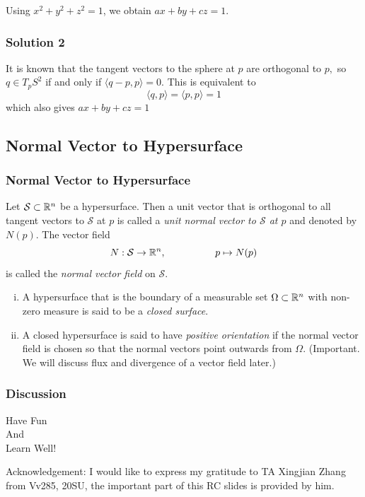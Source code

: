 \documentclass[12pt, t]{beamer}
\renewcommand{\emph}[1]{{\color{Turquoise3}\textsl{#1}}}
\begin{document}
\begin{frame}[allowframebreaks]
    Using $x^2 + y^2 + z^2 = 1$, we obtain $ax + by + cz = 1$.
\end{frame}

\begin{frame}
    \frametitle{Solution 2}
    It is known that the tangent vectors to the sphere at $p$ are orthogonal to $p,$ so $q \in T_{p} S^{2}$ if and only if $\langle q-p, p\rangle=0 .$ This is equivalent to
    \[
        \langle q, p\rangle=\langle p, p\rangle=1
    \]
    which also gives $a x+b y+c z=1$


\end{frame}

\subsection{Normal Vector to Hypersurface}
\begin{frame}
    \frametitle{Normal Vector to Hypersurface}
    Let $\mathcal{S}\subset\mathbb{R}^n$ be a hypersurface. Then a unit vector that is orthogonal to all tangent vectors to $\mathcal{S}$ at $p$ is called a \emph{unit normal vector to $\mathcal{S}$ at $p$} and denoted by $N(p)$. The vector field
    \[N:\mathcal{S}\to\mathbb{R}^n,\qquad\qquad\quad
        p\mapsto N(p)\]
    is called the \emph{normal vector field} on $\mathcal{S}$.

    \begin{enumerate}[(i)]
        \item A hypersurface that is the boundary of a measurable set $\Omega\subset\mathbb{R}^n$ with non-zero measure is said to be a \emph{closed surface}.
        \item A closed hypersurface is said to have \emph{positive orientation} if the
              normal vector field is chosen so that the normal vectors point
              outwards from $\Omega$. (Important. We will discuss flux and divergence of a vector field later.)
    \end{enumerate}
\end{frame}


\begin{frame}
    \frametitle{Discussion}
    \vspace{1cm}
    \begin{center}
        \LARGE
        Have Fun\\
        And\\
        Learn Well!
    \end{center}
    \vspace{2cm}
    \footnotesize Acknowledgement: I would like to express my gratitude to TA Xingjian Zhang from Vv285, 20SU, the important part of this RC slides is provided by him.
\end{frame}
\end{document}
